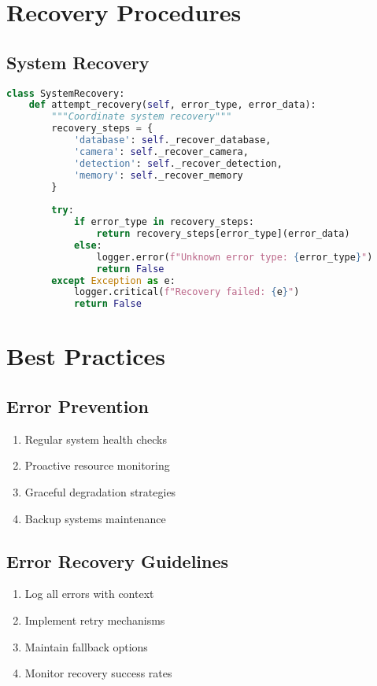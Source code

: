 \section{Recovery Procedures}

\subsection{System Recovery}
\begin{lstlisting}[language=Python]
class SystemRecovery:
    def attempt_recovery(self, error_type, error_data):
        """Coordinate system recovery"""
        recovery_steps = {
            'database': self._recover_database,
            'camera': self._recover_camera,
            'detection': self._recover_detection,
            'memory': self._recover_memory
        }
        
        try:
            if error_type in recovery_steps:
                return recovery_steps[error_type](error_data)
            else:
                logger.error(f"Unknown error type: {error_type}")
                return False
        except Exception as e:
            logger.critical(f"Recovery failed: {e}")
            return False
\end{lstlisting}

\section{Best Practices}

\subsection{Error Prevention}
\begin{enumerate}
    \item Regular system health checks
    \item Proactive resource monitoring
    \item Graceful degradation strategies
    \item Backup systems maintenance
\end{enumerate}

\subsection{Error Recovery Guidelines}
\begin{enumerate}
    \item Log all errors with context
    \item Implement retry mechanisms
    \item Maintain fallback options
    \item Monitor recovery success rates
\end{enumerate}